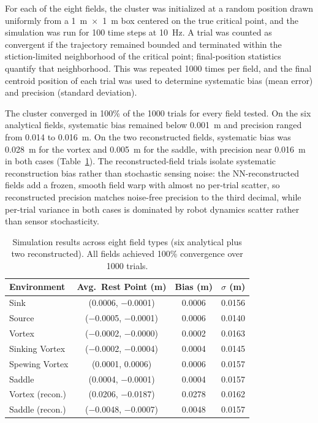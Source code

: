 \documentclass[12pt, letterpaper, oneside]{report}
\begin{document}
For each of the eight fields, the cluster was initialized at a random
position drawn uniformly from a 1~m~$\times$~1~m box centered on the true
critical point, and the simulation was run for 100 time steps at 10~Hz. A
trial was counted as convergent if the trajectory remained bounded and
terminated within the stiction-limited neighborhood of the critical point;
final-position statistics quantify that neighborhood. This was repeated
1000 times per field, and the final centroid position of each trial was
used to determine systematic bias (mean error) and precision (standard
deviation).

The cluster converged in 100\% of the 1000 trials for every field tested.
On the six analytical fields, systematic bias remained below 0.001~m and
precision ranged from 0.014 to 0.016~m. On the two reconstructed fields,
systematic bias was 0.028~m for the vortex and 0.005~m for the saddle, with
precision near 0.016~m in both cases (Table~\ref{tab:simulation_estimation_results}).
The reconstructed-field trials isolate systematic reconstruction bias rather
than stochastic sensing noise: the NN-reconstructed fields add a frozen,
smooth field warp with almost no per-trial scatter, so reconstructed
precision matches noise-free precision to the third decimal, while per-trial
variance in both cases is dominated by robot dynamics scatter rather than
sensor stochasticity.

\begin{table}[!t]
\footnotesize
\centering
\caption{Simulation results across eight field types (six analytical plus
two reconstructed). All fields achieved 100\% convergence over 1000 trials.}
\label{tab:simulation_estimation_results}
\begin{tabular}{lccc}
\toprule
\textbf{Environment} & \textbf{Avg.\ Rest Point (m)} & \textbf{Bias (m)} & \textbf{$\sigma$ (m)} \\
\midrule
Sink & (0.0006, $-$0.0001) & 0.0006 & 0.0156 \\
Source & ($-$0.0005, $-$0.0001) & 0.0006 & 0.0140 \\
Vortex & ($-$0.0002, $-$0.0000) & 0.0002 & 0.0163 \\
Sinking Vortex & ($-$0.0002, $-$0.0004) & 0.0004 & 0.0145 \\
Spewing Vortex & (0.0001, 0.0006) & 0.0006 & 0.0157 \\
Saddle & (0.0004, $-$0.0001) & 0.0004 & 0.0157 \\
Vortex (recon.) & (0.0206, $-$0.0187) & 0.0278 & 0.0162 \\
Saddle (recon.) & ($-$0.0048, $-$0.0007) & 0.0048 & 0.0157 \\
\bottomrule
\end{tabular}
\end{table}
\end{document}
